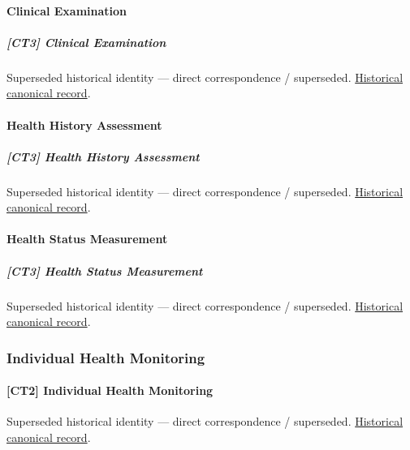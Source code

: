 \paragraph{Clinical Examination}

\subparagraph{[CT3] Clinical Examination}

\par\label{element:8bc15e2b8f114deebcbbe3f2013a8147}
Superseded historical identity — direct correspondence / superseded. \href{../../../../continuum/strategy/capability/8bc15e2b8f114deebcbbe3f2013a8147.md}{Historical canonical record}.\par

\paragraph{Health History Assessment}

\subparagraph{[CT3] Health History Assessment}

\par\label{element:bcaacf446f45443eafd8e21a1fd74ee1}
Superseded historical identity — direct correspondence / superseded. \href{../../../../continuum/strategy/capability/bcaacf446f45443eafd8e21a1fd74ee1.md}{Historical canonical record}.\par

\paragraph{Health Status Measurement}

\subparagraph{[CT3] Health Status Measurement}

\par\label{element:3717906f7f8840d3a8a3e3877543dd18}
Superseded historical identity — direct correspondence / superseded. \href{../../../../continuum/strategy/capability/3717906f7f8840d3a8a3e3877543dd18.md}{Historical canonical record}.\par

\subsubsection{Individual Health Monitoring}

\paragraph{[CT2] Individual Health Monitoring}

\par\label{element:31e7c27556314cafb74d040441d2dac6}
Superseded historical identity — direct correspondence / superseded. \href{../../../../continuum/strategy/capability/31e7c27556314cafb74d040441d2dac6.md}{Historical canonical record}.\par

